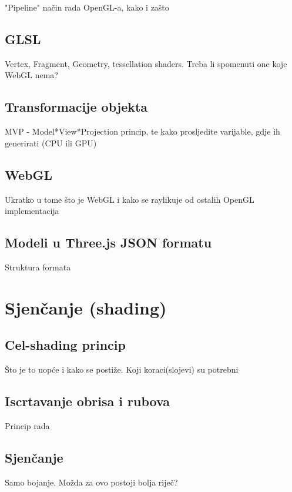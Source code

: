 \documentclass[a4paper]{article}
\begin{document}
"Pipeline" način rada OpenGL-a, kako i zašto

\subsection{GLSL}

Vertex, Fragment, Geometry, tessellation shaders. Treba li spomenuti one koje WebGL nema?

\subsection{Transformacije objekta}

MVP - Model*View*Projection princip, te kako prosljedite varijable, gdje ih generirati (CPU ili GPU)

\subsection{WebGL}

Ukratko u tome što je WebGL i kako se raylikuje od ostalih OpenGL implementacija

\subsection{Modeli u Three.js JSON formatu}

Struktura formata




\section{Sjenčanje (shading)}

\subsection{Cel-shading princip}

Što je to uopće i kako se postiže. Koji koraci(slojevi) su potrebni

\subsection{Iscrtavanje obrisa i rubova}

Princip rada

\subsection{Sjenčanje}

Samo bojanje. Možda za ovo postoji bolja riječ?
\end{document}
